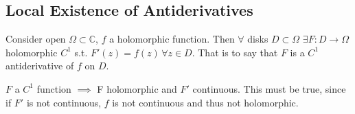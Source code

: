 

\subsection{Local Existence of Antiderivatives}


\begin{corollary}\label{cor:local-prim}
Consider open $\Omega \subset \mathbb{C}$, $f$ a holomorphic function. Then $\forall$ disks $D\subset \Omega \, \, \exists F:D\rightarrow \Omega$ holomorphic $C^1$ s.t. $F'(z)=f(z) \, \forall z\in D$. That is to say that $F$ is a $C^1$ antiderivative of $f$ on $D$.
\end{corollary}

\begin{note}
$F$ a $C^1$ function $\implies$ F holomorphic and $F'$ continuous. This must be true, since if $F'$ is not continuous, $f$ is not continuous and thus not holomorphic.
\end{note}



